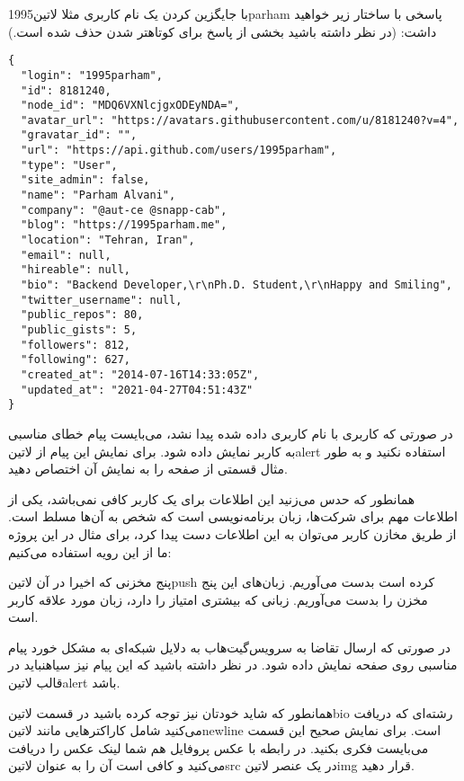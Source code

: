 با جایگزین کردن یک نام کاربری مثلا ‌لاتین{1995parham} پاسخی با ساختار زیر خواهید داشت:
(در نظر داشته باشید بخشی از پاسخ برای کوتاهتر شدن حذف شده است.)

\begin{latin}
\begin{verbatim}
{
  "login": "1995parham",
  "id": 8181240,
  "node_id": "MDQ6VXNlcjgxODEyNDA=",
  "avatar_url": "https://avatars.githubusercontent.com/u/8181240?v=4",
  "gravatar_id": "",
  "url": "https://api.github.com/users/1995parham",
  "type": "User",
  "site_admin": false,
  "name": "Parham Alvani",
  "company": "@aut-ce @snapp-cab",
  "blog": "https://1995parham.me",
  "location": "Tehran, Iran",
  "email": null,
  "hireable": null,
  "bio": "Backend Developer,\r\nPh.D. Student,\r\nHappy and Smiling",
  "twitter_username": null,
  "public_repos": 80,
  "public_gists": 5,
  "followers": 812,
  "following": 627,
  "created_at": "2014-07-16T14:33:05Z",
  "updated_at": "2021-04-27T04:51:43Z"
}
\end{verbatim}
\end{latin}

در صورتی که کاربری با نام کاربری داده شده پیدا نشد، می‌بایست پیام خطای مناسبی به کاربر نمایش داده شود.
برای نمایش این پیام از ‌لاتین{alert} استفاده نکنید و به طور مثال قسمتی از صفحه را به نمایش آن اختصاص دهید.

همانطور که حدس می‌زنید این اطلاعات برای یک کاربر کافی نمی‌باشد، یکی از اطلاعات مهم برای شرکت‌ها، زبان برنامه‌نویسی است که شخص به آن‌ها مسلط است.
از طریق مخازن کاربر می‌توان به این اطلاعات دست پیدا کرد، برای مثال در این پروژه ما از این رویه استفاده می‌کنیم:

 پنج مخزنی که اخیرا در آن ‌لاتین{push} کرده است بدست می‌آوریم.
 زبان‌های این پنج مخزن را بدست می‌آوریم.
 زبانی که بیشتری امتیاز را دارد، زبان مورد علاقه کاربر است.

در صورتی که ارسال تقاضا به سرویس‌گیت‌هاب به دلایل شبکه‌ای به مشکل خورد پیام مناسبی روی صفحه نمایش داده شود.
در نظر داشته باشید که این پیام نیز ‌سیاه{نباید} در قالب ‌لاتین{alert} باشد.

همانطور که شاید خودتان نیز توجه کرده باشید در قسمت ‌لاتین{bio} رشته‌ای که دریافت می‌کنید شامل کاراکترهایی مانند ‌لاتین{newline} ‌است. برای نمایش صحیح این قسمت می‌بایست فکری بکنید.
در رابطه با عکس پروفایل هم شما لینک عکس را دریافت می‌کنید و کافی است آن را به عنوان ‌لاتین{src} در یک عنصر ‌لاتین{img} قرار دهید.

